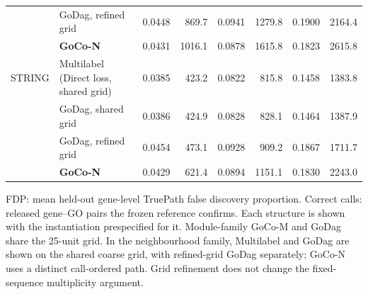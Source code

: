 \begin{table}[htbp]
\begin{tabular}{ll rr rr rr}
 & GoDag, refined grid & 0.0448 & 869.7 & 0.0941 & 1279.8 & 0.1900 & 2164.4 \\
 & \textbf{GoCo-N} & 0.0431 & 1016.1 & 0.0878 & 1615.8 & 0.1823 & 2615.8 \\
\addlinespace[2pt]
STRING & Multilabel (Direct loss, shared grid) & 0.0385 & 423.2 & 0.0822 & 815.8 & 0.1458 & 1383.8 \\
 & GoDag, shared grid & 0.0386 & 424.9 & 0.0828 & 828.1 & 0.1464 & 1387.9 \\
 & GoDag, refined grid & 0.0454 & 473.1 & 0.0928 & 909.2 & 0.1867 & 1711.7 \\
 & \textbf{GoCo-N} & 0.0429 & 621.4 & 0.0894 & 1151.1 & 0.1830 & 2243.0 \\
\bottomrule
\end{tabular}
\par\vspace{3pt}\begin{minipage}{\linewidth}\footnotesize FDP: mean held-out gene-level TruePath false discovery proportion. Correct calls: released gene--GO pairs the frozen reference confirms. Each structure is shown with the instantiation prespecified for it. Module-family GoCo-M and GoDag share the 25-unit grid. In the neighbourhood family, Multilabel and GoDag are shown on the shared coarse grid, with refined-grid GoDag separately; GoCo-N uses a distinct call-ordered path. Grid refinement does not change the fixed-sequence multiplicity argument.\end{minipage}
\end{table}
